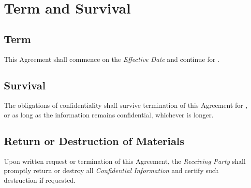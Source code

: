 
\section{Term and Survival}
\label{sec:survival}

\subsection{Term}
\label{sec:term}

This Agreement shall commence on the \textit{Effective Date} and continue for \AgreementDuration{}. 

\subsection{Survival}
\label{sec:survival}
The obligations of confidentiality shall survive termination of this Agreement for \AgreementSurvival{}, or as long as the information remains confidential, whichever is longer.

\subsection{Return or Destruction of Materials}
\label{sec:destruction}
Upon written request or termination of this Agreement, the \textit{Receiving Party} shall promptly return or destroy all \textit{Confidential Information} and certify such destruction if requested.

